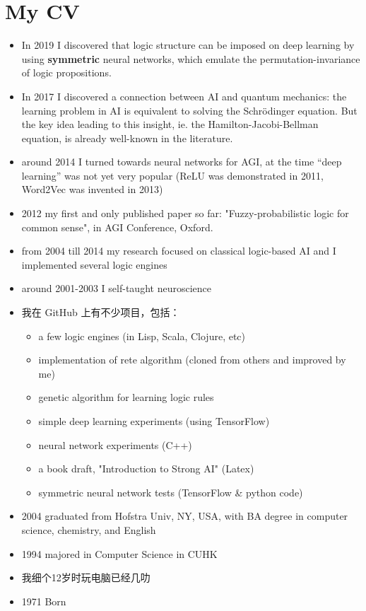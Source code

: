 \section*{My CV}

\begin{itemize}
	\item In 2019 I discovered that logic structure can be imposed on deep learning by using \textbf{symmetric} neural networks, which emulate the permutation-invariance of logic propositions.
	\item In 2017 I discovered a connection between AI and quantum mechanics: the learning problem in AI is equivalent to solving the Schr\"{o}dinger equation.  But the key idea leading to this insight, ie. the Hamilton-Jacobi-Bellman equation, is already well-known in the literature.

	\item around 2014 I turned towards neural networks for AGI, at the time ``deep learning'' was not yet very popular (ReLU was demonstrated in 2011, Word2Vec was invented in 2013)
	\item 2012 my first and only published paper so far: "Fuzzy-probabilistic logic for common sense", in AGI Conference, Oxford.
	\item from 2004 till 2014 my research focused on classical logic-based AI and I implemented several logic engines
	\item around 2001-2003 I self-taught neuroscience

	\item 我在 GitHub 上有不少项目，包括：
	\begin{itemize}
		\item a few logic engines (in Lisp, Scala, Clojure, etc)
		\item implementation of rete algorithm (cloned from others and improved by me)
		\item genetic algorithm for learning logic rules
		\item simple deep learning experiments (using TensorFlow)
		\item neural network experiments (C++)
		\item a book draft, "Introduction to Strong AI" (Latex)
		\item symmetric neural network tests (TensorFlow \& python code)
	\end{itemize}

	\item 2004 graduated from Hofstra Univ, NY, USA, with BA degree in computer science, chemistry, and English
	\item 1994 majored in Computer Science in CUHK
	\item 我细个12岁时玩电脑已经几叻
	\item 1971 Born
\end{itemize}

